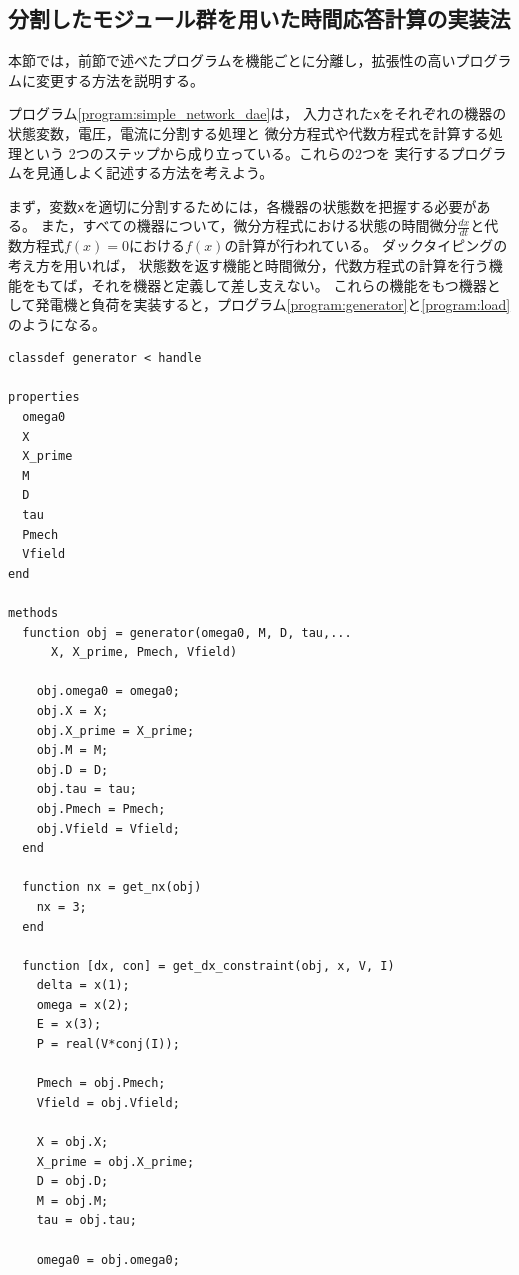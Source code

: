 \documentclass[tombow,dvipdfmx]{corona-a5-1.1}
\begin{document}
\subsection{分割したモジュール群を用いた時間応答計算の実装法}

本節では，前節で述べたプログラムを機能ごとに分離し，拡張性の高いプログラムに変更する方法を説明する。

\begin{例}[発電機と負荷のモジュール化]\label{ex:gen_load}
  プログラム\nobreak\ref{program:simple_network_dae}は，
  入力された\verb|x|をそれぞれの機器の状態変数，電圧，電流に分割する処理と
  微分方程式や代数方程式を計算する処理という
  2つのステップから成り立っている。これらの2つを
 実行するプログラムを見通しよく記述する方法を考えよう。
 
  まず，変数\verb|x|を適切に分割するためには，各機器の状態数を把握する必要がある。
  また，すべての機器について，微分方程式における状態の時間微分$\tfrac{dx}{dt}$と代数方程式$f(x)=0$における$f(x)$の計算が行われている。
  ダックタイピングの考え方を用いれば，
  状態数を返す機能と時間微分，代数方程式の計算を行う機能をもてば，それを機器と定義して差し支えない。
  これらの機能をもつ機器として発電機と負荷を実装すると，プログラム\nobreak\ref{program:generator}と\ref{program:load}のようになる。

\smallskip
\begin{PROGRAMA}[count,title={generator.m}]\label{program:generator}
\begin{verbatim}
classdef generator < handle
  
properties
  omega0
  X
  X_prime
  M
  D
  tau
  Pmech
  Vfield
end

methods
  function obj = generator(omega0, M, D, tau,...
      X, X_prime, Pmech, Vfield)

    obj.omega0 = omega0;
    obj.X = X;
    obj.X_prime = X_prime;
    obj.M = M;
    obj.D = D;
    obj.tau = tau;
    obj.Pmech = Pmech;
    obj.Vfield = Vfield;
  end

  function nx = get_nx(obj)
    nx = 3;
  end

  function [dx, con] = get_dx_constraint(obj, x, V, I)
    delta = x(1);
    omega = x(2);
    E = x(3);
    P = real(V*conj(I));

    Pmech = obj.Pmech;
    Vfield = obj.Vfield;

    X = obj.X;
    X_prime = obj.X_prime;
    D = obj.D;
    M = obj.M;
    tau = obj.tau;

    omega0 = obj.omega0;


\end{verbatim}
\end{PROGRAMA}
\end{例}
\end{document}
